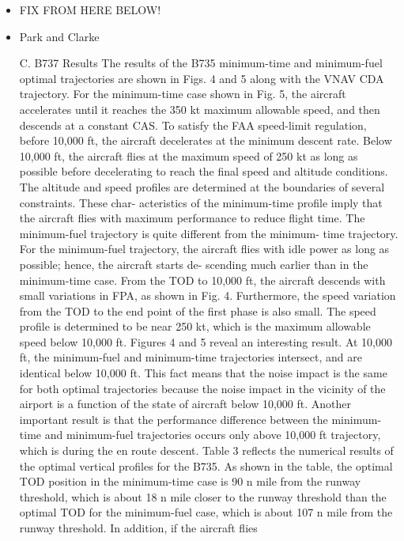 \documentclass{aer1315-pretty}
\begin{document}
\begin{itemize}

\item FIX FROM HERE BELOW!

\item Park and Clarke \cite{Park:2015} 

C. B737 Results
The results of the B735 minimum-time and minimum-fuel optimal
trajectories are shown in Figs. 4 and 5 along with the VNAV CDA
trajectory. For the minimum-time case shown in Fig. 5, the aircraft
accelerates until it reaches the 350 kt maximum allowable speed, and
then descends at a constant CAS. To satisfy the FAA speed-limit
regulation, before 10,000 ft, the aircraft decelerates at the minimum
descent rate. Below 10,000 ft, the aircraft flies at the maximum speed
of 250 kt as long as possible before decelerating to reach the final
speed and altitude conditions. The altitude and speed profiles are
determined at the boundaries of several constraints. These char-
acteristics of the minimum-time profile imply that the aircraft flies
with maximum performance to reduce flight time.
The minimum-fuel trajectory is quite different from the minimum-
time trajectory. For the minimum-fuel trajectory, the aircraft flies
with idle power as long as possible; hence, the aircraft starts de-
scending much earlier than in the minimum-time case. From the TOD
to 10,000 ft, the aircraft descends with small variations in FPA, as
shown in Fig. 4. Furthermore, the speed variation from the TOD to the
end point of the first phase is also small. The speed profile is
determined to be near 250 kt, which is the maximum allowable speed
below 10,000 ft.
Figures 4 and 5 reveal an interesting result. At 10,000 ft, the
minimum-fuel and minimum-time trajectories intersect, and are
identical below 10,000 ft. This fact means that the noise impact is the
same for both optimal trajectories because the noise impact in the
vicinity of the airport is a function of the state of aircraft below
10,000 ft. Another important result is that the performance difference
between the minimum-time and minimum-fuel trajectories occurs
only above 10,000 ft trajectory, which is during the en route descent.
Table 3 reflects the numerical results of the optimal vertical
profiles for the B735. As shown in the table, the optimal TOD
position in the minimum-time case is 90 n mile from the runway
threshold, which is about 18 n mile closer to the runway threshold
than the optimal TOD for the minimum-fuel case, which is about
107 n mile from the runway threshold. In addition, if the aircraft flies

\end{itemize}
\end{document}
